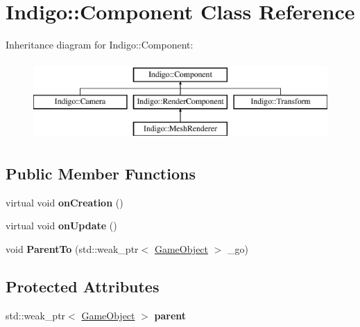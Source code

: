 \hypertarget{class_indigo_1_1_component}{}\section{Indigo\+:\+:Component Class Reference}
\label{class_indigo_1_1_component}
Inheritance diagram for Indigo\+:\+:Component\+:\begin{figure}[H]
\begin{center}
\leavevmode
\includegraphics[height=3.000000cm]{class_indigo_1_1_component}
\end{center}
\end{figure}
\subsection*{Public Member Functions}
\begin{DoxyCompactItemize}
\item 
\mbox{\label{class_indigo_1_1_component_a8d4d1a4fc814e5da5c6982307e987b3b}} 
virtual void {\bfseries on\+Creation} ()
\item 
\mbox{\label{class_indigo_1_1_component_aa1a172b154b360b1f639402feafe2e82}} 
virtual void {\bfseries on\+Update} ()
\item 
\mbox{\label{class_indigo_1_1_component_a25c63cb94a289d25074d5b974cef0075}} 
void {\bfseries Parent\+To} (std\+::weak\+\_\+ptr$<$ \hyperlink{class_indigo_1_1_game_object}{Game\+Object} $>$ \+\_\+go)
\end{DoxyCompactItemize}
\subsection*{Protected Attributes}
\begin{DoxyCompactItemize}
\item 
\mbox{\label{class_indigo_1_1_component_a2b153d0ff77ec7c38a8881aa4d8cc110}} 
std\+::weak\+\_\+ptr$<$ \hyperlink{class_indigo_1_1_game_object}{Game\+Object} $>$ {\bfseries parent}
\end{DoxyCompactItemize}
